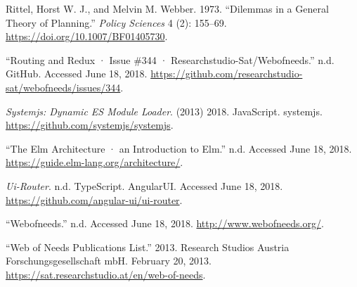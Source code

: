 \documentclass[a4paper,,tablecaptionabove]{scrbook}
\begin{document}
\leavevmode\hypertarget{ref-RittelDilemmasgeneraltheory1973}{}%
Rittel, Horst W. J., and Melvin M. Webber. 1973. ``Dilemmas in a General
Theory of Planning.'' \emph{Policy Sciences} 4 (2): 155--69.
\url{https://doi.org/10.1007/BF01405730}.

\leavevmode\hypertarget{ref-RoutingReduxIssue}{}%
``Routing and Redux · Issue \#344 · Researchstudio-Sat/Webofneeds.''
n.d. GitHub. Accessed June 18, 2018.
\url{https://github.com/researchstudio-sat/webofneeds/issues/344}.

\leavevmode\hypertarget{ref-systemjsDynamicES2018}{}%
\emph{Systemjs: Dynamic ES Module Loader}. (2013) 2018. JavaScript.
systemjs. \url{https://github.com/systemjs/systemjs}.

\leavevmode\hypertarget{ref-ElmArchitectureIntroduction}{}%
``The Elm Architecture · an Introduction to Elm.'' n.d. Accessed June
18, 2018. \url{https://guide.elm-lang.org/architecture/}.

\leavevmode\hypertarget{ref-uirouter}{}%
\emph{Ui-Router}. n.d. TypeScript. AngularUI. Accessed June 18, 2018.
\url{https://github.com/angular-ui/ui-router}.

\leavevmode\hypertarget{ref-Webofneeds}{}%
``Webofneeds.'' n.d. Accessed June 18, 2018.
\url{http://www.webofneeds.org/}.

\leavevmode\hypertarget{ref-WebNeedsPublications2013}{}%
``Web of Needs Publications List.'' 2013. Research Studios Austria
Forschungsgesellschaft mbH. February 20, 2013.
\url{https://sat.researchstudio.at/en/web-of-needs}.
\end{document}
